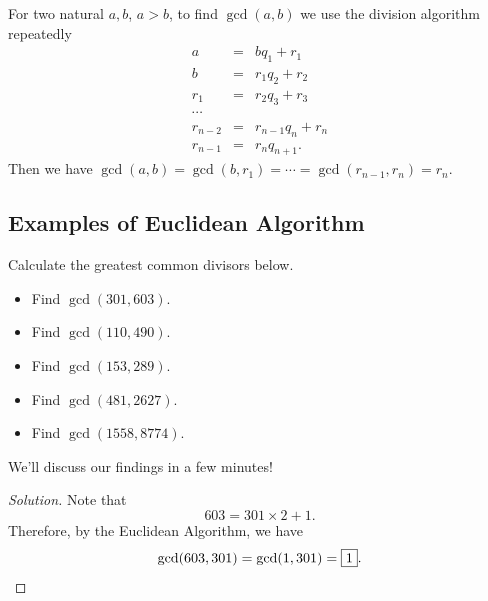 \clearpage


\begin{theorem}  For two natural $a,b$, $a>b$, to find $\gcd(a,b)$ we use the division algorithm repeatedly  \begin{eqnarray*}  a&=&bq_1+r_1 \\ b&=&r_1q_2+r_2 \\ r_1&=&r_2q_3+r_3 \\ \cdots \\ r_{n-2}&=&r_{n-1}q_n+r_n \\ r_{n-1}&=&r_nq_{n+1}. \end{eqnarray*}  
	Then we have $\gcd(a, b)=\gcd(b, r_1)=\cdots=\gcd(r_{n-1}, r_n)=r_n.$  \end{theorem}
\clearpage

\subsection*{Examples of Euclidean Algorithm}

Calculate the greatest common divisors below.

\begin{itemize}
		\item Find $\gcd(301, 603)$.  
		\item  Find $\gcd(110, 490)$.
		\item  Find $\gcd(153, 289)$.
		\item  Find $\gcd(481, 2627)$. 
\end{itemize}
\begin{itemize}[label=$\star$]
		\item Find $\gcd(1558, 8774)$. 
\end{itemize} 

We'll discuss our findings in a few minutes!

\clearpage


\begin{proof}[Solution]  
Note that $$603=301\times 2+1.$$  Therefore, by the Euclidean Algorithm, we have $$\gcd(603, 301)=\gcd(1, 301)=\framebox{1}.$$ 

\end{proof}

\clearpage


